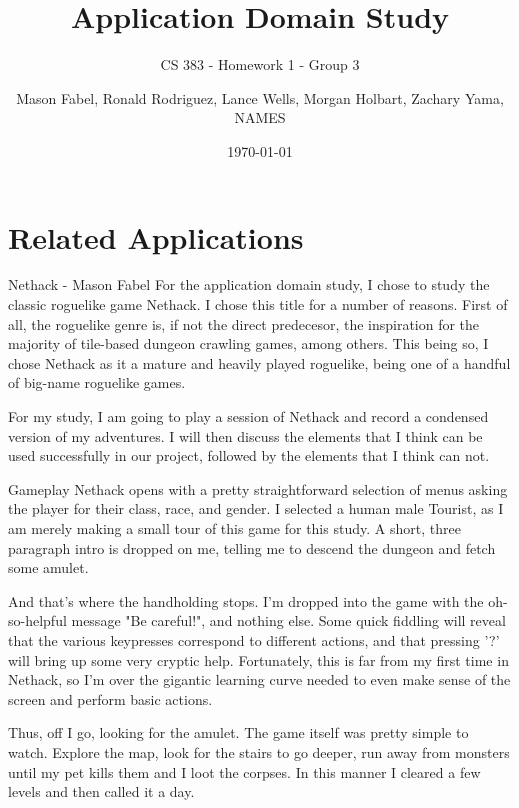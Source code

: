 \documentclass[12pt]{report}
\title{Application Domain Study}
\subtitle{CS 383 - Homework 1 - Group 3}
\author{Mason Fabel, Ronald Rodriguez, Lance Wells, Morgan Holbart, Zachary Yama, NAMES} %
\date{\today}
\begin{document}
\maketitle

\chapter{Related Applications}


\begin{section}{Nethack - Mason Fabel}
For the application domain study, I chose to study the classic roguelike
game Nethack. I chose this title for a number of reasons. First of all,
the roguelike genre is, if not the direct predecesor, the inspiration for
the majority of tile-based dungeon crawling games, among others. This being
so, I chose Nethack as it a mature and heavily played roguelike, being one
of a handful of big-name roguelike games.

For my study, I am going to play a session of Nethack and record a
condensed version of my adventures. I will then discuss the elements that
I think can be used successfully in our project, followed by the elements
that I think can not.

\begin{subsection}{Gameplay}
Nethack opens with a pretty straightforward selection of menus asking the
player for their class, race, and gender. I selected a human male Tourist,
as I am merely making a small tour of this game for this study. A short,
three paragraph intro is dropped on me, telling me to descend the
dungeon and fetch some amulet.

And that's where the handholding stops. I'm dropped into the game with the
oh-so-helpful message "Be careful!", and nothing else. Some quick fiddling
will reveal that the various keypresses correspond to different actions,
and that pressing '?' will bring up some very cryptic help. Fortunately,
this is far from my first time in Nethack, so I'm over the gigantic
learning curve needed to even make sense of the screen and perform basic
actions.

Thus, off I go, looking for the amulet. The game itself was pretty simple
to watch. Explore the map, look for the stairs to go deeper, run away from
monsters until my pet kills them and I loot the corpses. In this manner I
cleared a few levels and then called it a day.
\end{subsection}


\end{section}
\end{document}
